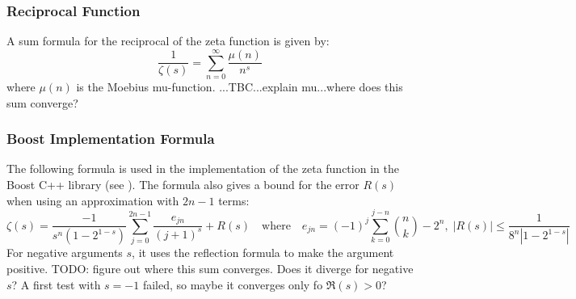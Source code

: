 \documentclass[12pt]{article}
\begin{document}
\subsubsection{Reciprocal Function}
A sum formula for the reciprocal of the zeta function is given by:
\begin{equation}
\frac{1}{\zeta(s)} = \sum_{n=0}^{\infty} \frac{\mu(n)}{n^s}
\end{equation}
where $\mu(n)$ is the Moebius mu-function. ...TBC...explain mu...where does this sum converge?

\subsubsection{Boost Implementation Formula}
The following formula is used in the implementation of the zeta function in the Boost C++ library (see \cite{Boost}). The formula also gives a bound for the error $R(s)$ when using an approximation with $2n-1$ terms:
\begin{equation}
\zeta(s)
= \frac{-1}{s^n(1-2^{1-s})}	\sum_{j=0}^{2n-1} \frac{e_{jn}}{(j+1)^s} + R(s) 
\quad \text{where} \quad
e_{jn} = (-1)^j \sum_{k=0}^{j-n} \binom{n}{k} - 2^n, \;
|R(s)| \leq \frac{1}{8^n |1-2^{1-s}|}
\end{equation}
For negative arguments $s$, it uses the reflection formula to make the argument positive. TODO: figure out where this sum converges. Does it diverge for negative $s$? A first test with $s=-1$ failed, so maybe it converges only fo $\Re(s) > 0$?







\end{document}
